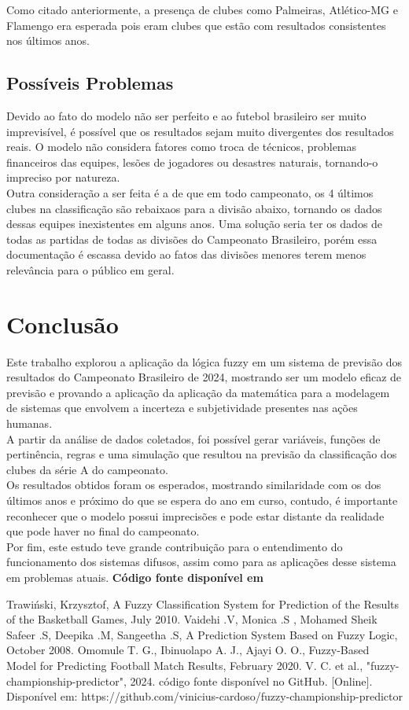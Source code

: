 \documentclass[conference]{IEEEtran}
\begin{document}
\indent Como citado anteriormente, a presença de clubes como Palmeiras, 
Atlético-MG e Flamengo era esperada pois eram clubes que estão com resultados 
consistentes nos últimos anos.

\subsection{Possíveis Problemas}
\indent Devido ao fato do modelo não ser perfeito e ao futebol brasileiro ser 
muito imprevisível, é possível que os resultados sejam muito divergentes dos 
resultados reais. O modelo não considera fatores como troca de técnicos, 
problemas financeiros das equipes, lesões de jogadores ou desastres naturais, 
tornando-o impreciso por natureza.\\
\indent Outra consideração a ser feita é a de que em todo campeonato, os 4 últimos 
clubes na classificação são rebaixaos para a divisão abaixo, tornando os dados 
dessas equipes inexistentes em alguns anos. Uma solução seria ter os dados de 
todas as partidas de todas as divisões do Campeonato Brasileiro, porém essa 
documentação é escassa devido ao fatos das divisões menores terem menos 
relevância para o público em geral.

\section{Conclusão}
\indent Este trabalho explorou a aplicação da lógica fuzzy em um sistema de 
previsão dos resultados do Campeonato Brasileiro de 2024, mostrando ser um modelo 
eficaz de previsão e provando a aplicação da aplicação da matemática para a 
modelagem de sistemas que envolvem a incerteza e subjetividade presentes nas 
ações humanas.\\
\indent A partir da análise de dados coletados, foi possível gerar variáveis, 
funções de pertinência, regras e uma simulação que resultou na previsão da 
classificação dos clubes da série A do campeonato.\\
\indent Os resultados obtidos foram os esperados, mostrando similaridade com 
os dos últimos anos e próximo do que se espera do ano em curso, contudo, é 
importante reconhecer que o modelo possui imprecisões e pode estar distante da 
realidade que pode haver no final do campeonato.\\
\indent Por fim, este estudo teve grande contribuição para o entendimento do 
funcionamento dos sistemas difusos, assim como para as aplicações desse sistema 
em problemas atuais.
\indent \textbf{Código fonte disponível em \cite{b4}}

\begin{thebibliography}{00}
 Trawiński, Krzysztof, A Fuzzy Classification System for Prediction of the Results of the
Basketball Games, July 2010.
 Vaidehi .V, Monica .S , Mohamed Sheik Safeer .S, Deepika .M, Sangeetha .S, A Prediction System Based on Fuzzy Logic, October 2008.
 Omomule T. G., Ibinuolapo A. J., Ajayi O. O., Fuzzy-Based Model for Predicting Football Match Results, February 2020.
 V. C. et al., "fuzzy-championship-predictor", 2024. código fonte disponível no GitHub. [Online]. Disponível em: https://github.com/vinicius-cardoso/fuzzy-championship-predictor
\end{thebibliography}
\end{document}
